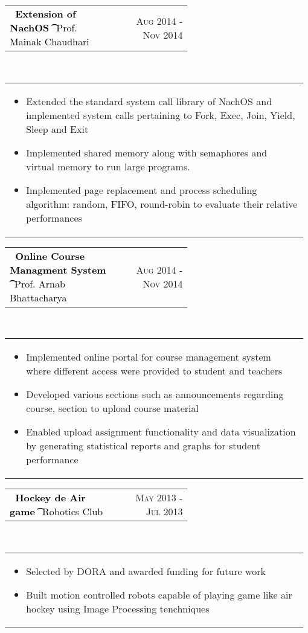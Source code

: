 \documentclass[a4paper]{article} %
\newcommand{\verticalspacing}{-0.55cm}
\newcommand{\bulletspace}{0.7cm}
\newcommand{\projectheadspacing}{6.9cm}
\newcommand{\aproject}[5]{%
    \begin{tabular}{p{0.60\linewidth} r}
        \textcolor{Black}{\textbf{\large\ #2 \t }\small\ #3 } & \multicolumn{1}{m{ \projectheadspacing{} }}{\raggedleft \small {\textsc{#1}}}\\
    \end{tabular}\\
    \begin{tabular}{p{0.98\linewidth}}
    \vspace{-0.1cm}
        \small{#5}
    \end{tabular}
    \vspace{\verticalspacing{}}
}
\begin{document}
\aproject
    {Aug 2014 - Nov 2014}
    {Extension of NachOS}
    {Prof. Mainak Chaudhari}
    {}
    {%
        \vspace{-0.3cm}
        \begin{itemize}[itemsep = -0.8mm,leftmargin=\bulletspace{}]
            \item Extended the standard system call library of NachOS and implemented system calls pertaining to Fork, Exec, Join, Yield, Sleep and Exit
            \item Implemented shared memory along with semaphores and virtual memory to run large programs.
            \item Implemented page replacement and process scheduling algorithm: random, FIFO, round-robin to evaluate their relative performances 
        \end{itemize}
    }


\aproject
    {Aug 2014 - Nov 2014}
    {Online Course Managment System}
    {Prof. Arnab Bhattacharya}
    {}
    {%
        \vspace{-0.3cm}
        \begin{itemize}[itemsep = -0.8mm,leftmargin=\bulletspace{}]
            \item Implemented online portal for course management system where different access were provided to student and teachers
            \item Developed various sections such as announcements regarding course, section to upload course material
            \item Enabled upload assignment functionality and data visualization by generating statistical reports and graphs for student performance
        \end{itemize}
    }

\aproject
    {May 2013 - Jul 2013 }
    {Hockey de Air game}
    {Robotics Club}
    {}
    {%
        \vspace{-0.3cm}
        \begin{itemize}[itemsep = -0.8mm,leftmargin=\bulletspace{}]
            \item Selected by DORA and awarded funding for future work
            \item Built motion controlled robots capable of playing game like air hockey using Image Processing tenchniques
        \end{itemize}
    }

\vspace{-0.4cm}
\end{document}
